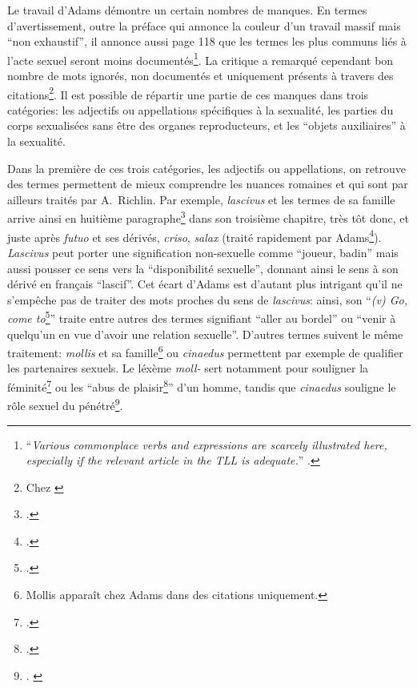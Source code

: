 Le travail d'Adams démontre un certain nombres de manques. En termes d'avertissement, outre la préface qui annonce la couleur d'un travail massif mais \enquote{non exhaustif}, il annonce aussi page 118 que les termes les plus communs liés à l'acte sexuel seront moins documentés\footnote{\enquote{\textit{Various commonplace verbs and expressions are scarcely illustrated here, especially if the relevant article in the TLL is adequate.}} \textcite[p.~118]{adams}.}. La critique a remarqué cependant bon nombre de mots ignorés, non documentés et uniquement présents à travers des citations\footnote{Chez \textcite{rousselle_j_1987, richlin1984latin}}. Il est possible de répartir une partie de ces manques dans trois catégories: les adjectifs ou appellations spécifiques à la sexualité, les parties du corps sexualisées sans être des organes reproducteurs, et les \enquote{objets auxiliaires} à la sexualité.

Dans la première de ces trois catégories, les adjectifs ou appellations, on retrouve des termes permettent de mieux comprendre les nuances romaines et qui sont par ailleurs traités par A.~Richlin. Par exemple, \textit{lascivus} et les termes de sa famille arrive ainsi en huitième paragraphe\footcite[p.~147]{richlin_sexual_1978} dans son troisième chapitre, très tôt donc, et juste après \textit{futuo} et ses dérivés, \textit{criso}, \textit{salax} (traité rapidement par Adams\footcite[p.~206]{adams}). \textit{Lascivus} peut porter une signification non-sexuelle comme \enquote{joueur, badin} mais aussi pousser ce sens vers la \enquote{disponibilité sexuelle}, donnant ainsi le sens à son dérivé en français \enquote{lascif}. Cet écart d'Adams est d'autant plus intrigant qu'il ne s'empêche pas de traiter des mots proches du sens de \textit{lascivus}: ainsi, son \enquote{\textit{(v) Go, come to}\footcite[p.~175]{adams}} traite entre autres des termes signifiant \enquote{aller au bordel} ou \enquote{venir à quelqu'un en vue d'avoir une relation sexuelle}. D'autres termes suivent le même traitement: \textit{mollis} et sa famille\footnote{Mollis apparaît chez Adams dans des citations uniquement.} ou \textit{cinaedus} permettent par exemple de qualifier les partenaires sexuels. Le léxème \textit{moll-} sert notamment pour souligner la féminité\footcite{williams_meanings_2013} ou les \enquote{abus de plaisir\footcite[p.~320]{dupont_lerotisme_2001}} d'un homme, tandis que \textit{cinaedus} souligne le rôle sexuel du pénétré\footnote{\textcite[p.~142]{puccini_delbey_vie_2010}. \textcite[p.~275]{dupont_lerotisme_2001}}.

